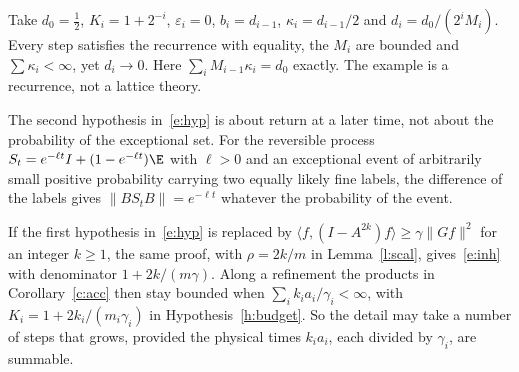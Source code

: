 \begin{remark}\label{r:budget}
Take $d_0=\tfrac12$, $K_i=1+2^{-i}$, $\varepsilon_i=0$, $b_i=d_{i-1}$, $\kappa_i=d_{i-1}/2$ and
$d_i=d_0/(2^iM_i)$. Every step satisfies the recurrence with equality, the $M_i$ are bounded and
$\sum\kappa_i<\infty$, yet $d_i\to0$. Here $\sum_iM_{i-1}\kappa_i=d_0$ exactly. The example is a recurrence,
not a lattice theory.
\end{remark}

\begin{remark}\label{r:reset}
The second hypothesis in~\eqref{e:hyp} is about return at a later time, not about the probability of the
exceptional set. For the reversible process $S_t=e^{-\ell t}I+(1-e^{-\ell t})\E$ with $\ell>0$ and an exceptional event of
arbitrarily small positive probability carrying two equally likely fine labels, the difference of the labels
gives $\|BS_tB\|=e^{-\ell t}$ whatever the probability of the event.
\end{remark}

\begin{remark}\label{r:lag}
If the first hypothesis in~\eqref{e:hyp} is replaced by $\langle f,(I-A^{2k})f\rangle\ge\gamma\|Gf\|^2$ for an
integer $k\ge1$, the same proof, with $\rho=2k/m$ in Lemma~\ref{l:scal}, gives~\eqref{e:inh} with denominator
$1+2k/(m\gamma)$. Along a refinement the products in Corollary~\ref{c:acc} then stay bounded when
$\sum_ik_ia_i/\gamma_i<\infty$, with $K_i=1+2k_i/(m_i\gamma_i)$ in Hypothesis~\ref{h:budget}. So the detail may take a number of steps that
grows, provided the physical times $k_ia_i$, each divided by $\gamma_i$, are summable.
\end{remark}

